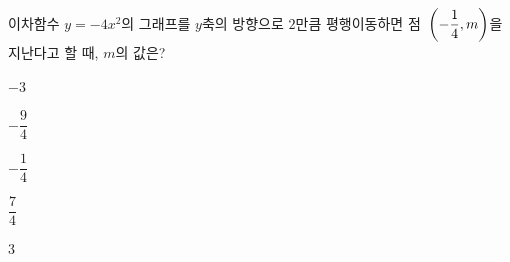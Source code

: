 이차함수 $y=-4x^2$의 그래프를 $y$축의 방향으로 $2$만큼 평행이동하면 점~$\left(-\dfrac{1}{4}{,}\mkern3mu m\right)$을 지난다고 할 때, $m$의 값은?
\begin{choices32}{\rule[-3ex]{0pt}{8ex}$-3$}{\rule[-3ex]{0pt}{8ex}$-\dfrac{9}{4}$}{\rule[-3ex]{0pt}{8ex}$-\dfrac{1}{4}$}{\rule[-3ex]{0pt}{8ex}$\dfrac{7}{4}$}{\rule[-3ex]{0pt}{8ex}$3$}\end{choices32}
